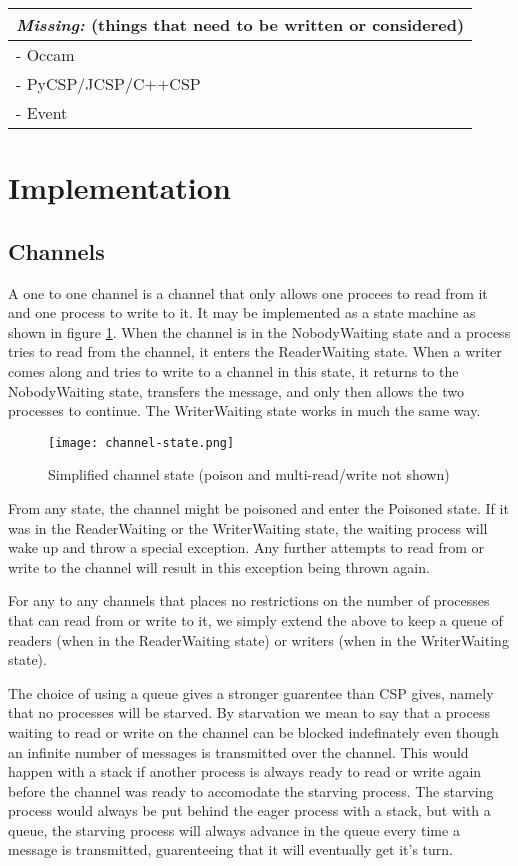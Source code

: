 \documentclass[a4paper,12pt]{article}
\newcommand{\missing}[1]{
\begin{tabular}{|p{11cm}|}
\hline
\emph{Missing:} {\scriptsize (things that need to be written or considered)} \\
\hline
#1
\hline
\end{tabular}
}
\begin{document}
\missing{
- Occam \\
- PyCSP/JCSP/C++CSP \\
- Event \\
}


\section{Implementation}


\subsection{Channels}
A one to one channel is a channel that only allows one procees to read from it and one process 
to write to it. It may be implemented as a state machine as shown in figure \ref{channel-state}.
When the channel is in the NobodyWaiting state and a process tries to read from the channel,
it enters the ReaderWaiting state. When a writer comes along and tries to write to a channel
in this state, it returns to the NobodyWaiting state, transfers the message, and only then
allows the two processes to continue. The WriterWaiting state works in much the same way.

\begin{figure}[h]
\centering
\texttt{[image: channel-state.png]}
\caption{Simplified channel state (poison and multi-read/write not shown)}
\label{channel-state}
\end{figure}

From any state, the channel might be poisoned and enter the Poisoned state. If it was in the
ReaderWaiting or the WriterWaiting state, the waiting process will wake up and throw a special
exception. Any further attempts to read from or write to the channel will result in this 
exception being thrown again.

For any to any channels that places no restrictions on the number of processes that can read
from or write to it, we simply extend the above to keep a queue of readers (when in the 
ReaderWaiting state) or writers (when in the WriterWaiting state).

The choice of using a queue gives a stronger guarentee than CSP gives, namely that no processes
will be starved. By starvation we mean to say that a process waiting to read or write on the
channel can be blocked indefinately even though an infinite number of messages is transmitted
over the channel. This would happen with a stack if another process is always ready to read or 
write again before the channel was ready to accomodate the starving process. The starving process
would always be put behind the eager process with a stack, but with a queue, the starving process
will always advance in the queue every time a message is transmitted, guarenteeing that it will
eventually get it's turn.
\end{document}
